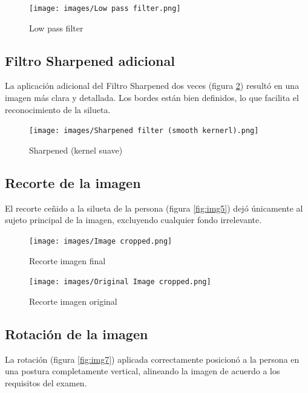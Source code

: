 \documentclass{article}
\begin{document}
\begin{figure}[!ht]
    \centering
    \texttt{[image: images/Low pass filter.png]}
    \caption{Low pass filter}
    \label{fig:img3}
\end{figure}

\subsection{Filtro Sharpened adicional}
La aplicación adicional del Filtro Sharpened dos veces (figura \ref{fig:img4}) resultó en una imagen más clara y detallada. Los bordes están bien definidos, lo que facilita el reconocimiento de la silueta.

\begin{figure}[!ht]
    \centering
    \texttt{[image: images/Sharpened filter (smooth kernerl).png]}
    \caption{Sharpened (kernel suave)}
    \label{fig:img4}
\end{figure}

\subsection{Recorte de la imagen}
El recorte ceñido a la silueta de la persona (figura \ref{fig:img5}) dejó únicamente al sujeto principal de la imagen, excluyendo cualquier fondo irrelevante.

\begin{figure}[htbp] %
    \centering
    \begin{minipage}[b]{0.45\textwidth}
        \centering
        \texttt{[image: images/Image cropped.png]}
        \caption{Recorte imagen final}
        \label{fig:img5}
    \end{minipage}
    \hfill %
    \begin{minipage}[b]{0.45\textwidth}
        \centering
        \texttt{[image: images/Original Image cropped.png]}
        \caption{Recorte imagen original}
        \label{fig:img6}
    \end{minipage}
\end{figure}

\subsection{Rotación de la imagen}
La rotación (figura \ref{fig:img7}) aplicada correctamente posicionó a la persona en una postura completamente vertical, alineando la imagen de acuerdo a los requisitos del examen.
\end{document}
